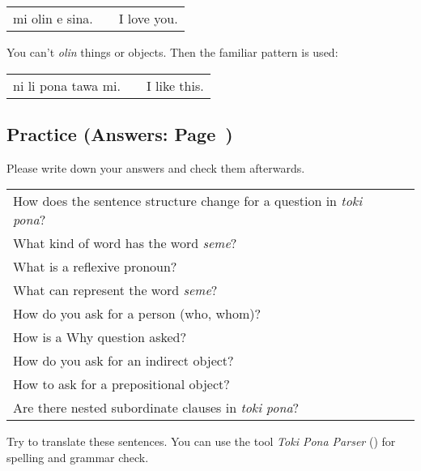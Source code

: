 \begin{supertabular}{p{5,5cm}|ll}
    mi olin e sina. &  & I love you. \\
\end{supertabular}

You can't \textit{olin} things or objects.
Then the familiar pattern is used:

\begin{supertabular}{p{5,5cm}|ll}
    ni li pona tawa mi. &  & I like this. \\
\end{supertabular}

\newpage

\subsection*{Practice (Answers: Page~\pageref{'questions_using_seme'})}
Please write down your answers and check them afterwards.

\begin{supertabular}{p{5,5cm}|ll}
    How does the sentence structure change for a question in \textit{toki pona}? &  & \\
    What kind of word has the word \textit{seme}?                                &  & \\
    What is a reflexive pronoun?                                                 &  & \\
    What can represent the word \textit{seme}?                                   &  & \\
    How do you ask for a person (who, whom)?                                     &  & \\
    How is a Why question asked?                                                 &  & \\
    How do you ask for an indirect object?                                       &  & \\
    How to ask for a prepositional object?                                       &  & \\
    Are there nested subordinate clauses in \textit{toki pona}?                  &  & \\
\end{supertabular}

Try to translate these sentences.
You can use the tool \textit{Toki Pona Parser} (\cite{www:rowa:02}) for spelling and grammar check.

